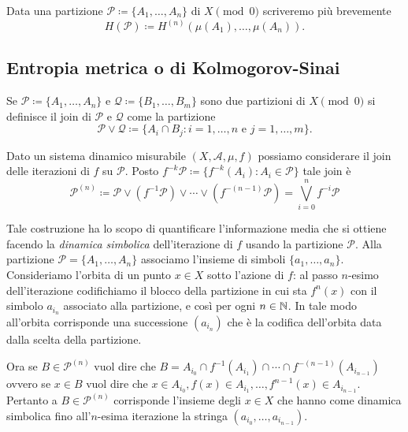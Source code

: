 Data una partizione $ \mathcal{P} \coloneqq \{A_1, \ldots, A_n\} $ di $ X \pmod{0} $ scriveremo più brevemente
\[ H(\mathcal{P}) \coloneqq H^{(n)}(\mu(A_1), \ldots, \mu(A_n)). \]

\subsection{Entropia metrica o di Kolmogorov-Sinai}

\begin{definition}
    Se $ \mathcal{P} \coloneqq \{A_1, \ldots, A_n\} $ e $ \mathcal{Q} \coloneqq \{B_1, \ldots, B_m\} $ sono due partizioni di $ X \pmod{0} $ si definisce il join di $ \mathcal{P} $ e $ \mathcal{Q} $ come la partizione
    \[
        \mathcal{P} \vee \mathcal{Q} \coloneqq \{A_i \cap B_j : i = 1, \ldots, n \text{ e } j = 1, \ldots, m\}.
    \]
\end{definition}

Dato un sistema dinamico misurabile $ (X, \mathcal{A}, \mu, f) $ possiamo considerare il join delle iterazioni di $ f $ su $ \mathcal{P} $. Posto $ f^{-k}\mathcal{P} \coloneqq \{f^{-k}(A_i) : A_i \in \mathcal{P}\} $ tale join è
\[
    \mathcal{P}^{(n)} \coloneqq \mathcal{P} \vee (f^{-1}\mathcal{P}) \vee \cdots \vee (f^{-(n-1)}\mathcal{P}) = \bigvee_{i=0}^{n}f^{-i}\mathcal{P}
\]

Tale costruzione ha lo scopo di quantificare l'informazione media che si ottiene facendo la \emph{dinamica simbolica} dell'iterazione di $ f $ usando la partizione $ \mathcal{P} $. Alla partizione $ \mathcal{P} = \{A_1, \ldots, A_n\} $ associamo l'insieme di simboli $ \{a_1, \ldots, a_n\} $. Consideriamo l'orbita di un punto $ x \in X $ sotto l'azione di $ f $: al passo $ n $-esimo dell'iterazione codifichiamo il blocco della partizione in cui sta $ f^{n}(x) $ con il simbolo $ a_{i_n} $ associato alla partizione, e così per ogni $ n \in \mathbb{N} $. In tale modo all'orbita corrisponde una successione $ (a_{i_n}) $ che è la codifica dell'orbita data dalla scelta della partizione.

Ora se $ B \in \mathcal{P}^{(n)} $ vuol dire che $ B = A_{i_0} \cap f^{-1}(A_{i_1}) \cap \cdots \cap f^{-(n-1)}(A_{i_{n-1}}) $ ovvero se $ x \in B $ vuol dire che $ x \in A_{i_0}, f(x) \in A_{i_1}, \ldots, f^{n-1}(x) \in A_{i_{n-1}} $. Pertanto a $ B \in \mathcal{P}^{(n)} $ corrisponde l'insieme degli $ x \in X $ che hanno come dinamica simbolica fino all'$ n $-esima iterazione la stringa $ (a_{i_0}, \ldots, a_{i_{n-1}}) $.

